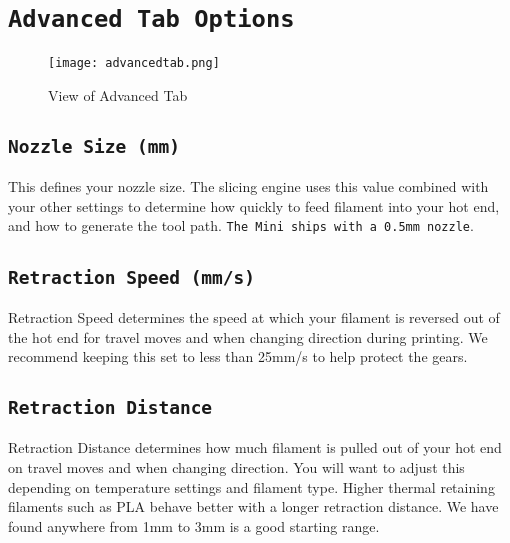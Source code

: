 \section{\texttt{Advanced Tab Options}}
\begin{figure}[H]
\centering
\texttt{[image: advancedtab.png]}
\caption{View of Advanced Tab}
\label{fig:View of Advanced Tab}
\end{figure}

\subsection{\texttt{Nozzle Size (mm)}}

This defines your nozzle size. The slicing engine uses this value combined with your other settings to determine how quickly to feed filament into your hot end, and how to generate the tool path. \texttt{The Mini ships with a 0.5mm nozzle}.

\subsection{\texttt{Retraction Speed (mm/s)}}
Retraction Speed determines the speed at which your filament is reversed out of the hot end for travel moves and when changing direction during printing. We recommend keeping this set to less than 25mm/s to help protect the gears.

\subsection{\texttt{Retraction Distance}}
Retraction Distance determines how much filament is pulled out of your hot end on travel moves and when changing direction. You will want to adjust this depending on temperature settings and filament type. Higher thermal retaining filaments such as PLA behave better with a longer retraction distance. We have found anywhere from 1mm to 3mm is a good starting range.

